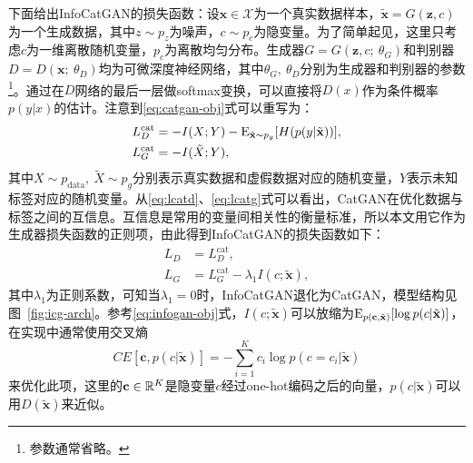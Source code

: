 下面给出InfoCatGAN的损失函数：设$\mathbf{x} \in \mathcal{X}$为一个真实数据样本，$\tilde{\mathbf{x}} = G(\mathbf{z}, c)$为一个生成数据，其中$z\sim p_z$为噪声，$c\sim p_c$为隐变量。为了简单起见，这里只考虑$c$为一维离散随机变量，$p_c$为离散均匀分布。生成器$G = G(\mathbf{z}, c; ~\theta_G)$和判别器$D = D(\mathbf{x}; ~\theta_D)$均为可微深度神经网络，其中$\theta_G, ~\theta_D$分别为生成器和判别器的参数\footnote{参数通常省略。}。通过在$D$网络的最后一层做softmax变换，可以直接将$D(x)$作为条件概率$p(y|x)$的估计。注意到\eqref{eq:catgan-obj}式可以重写为：
\begin{align}
  L_D^{\text{cat}} &= -I(X;Y)-
         \text{E}_{\tilde{\mathbf{x}} \sim p_g}[H(p(y|\tilde{\mathbf{x}}))], \label{eq:lcatd} \\
  L_G^{\text{cat}} &= -I(\tilde{X}; Y), \label{eq:lcatg}
\end{align}
其中$X \sim p_{\text{data}}, ~\tilde{X} \sim p_g$分别表示真实数据和虚假数据对应的随机变量，$Y$表示未知标签对应的随机变量。从\eqref{eq:lcatd}、\eqref{eq:lcatg}式可以看出，CatGAN在优化数据与标签之间的互信息。互信息是常用的变量间相关性的衡量标准，所以本文用它作为生成器损失函数的正则项，由此得到InfoCatGAN的损失函数如下：
\begin{equation}
\label{eq:infocatgan}
\begin{split}
  L_D &= L_D^{\text{cat}}, \\ 
  L_G &= L_G^{\text{cat}} - \lambda_1 I(c; \tilde{\mathbf{x}}),
\end{split}
\end{equation}
其中$\lambda_1$为正则系数，可知当$\lambda_1 = 0$时，InfoCatGAN退化为CatGAN，模型结构见图~\ref{fig:icg-arch}。参考\eqref{eq:infogan-obj}式，$I(c; \tilde{\mathbf{x}})$可以放缩为$\text{E}_{p(\mathbf{c},\tilde{\mathbf{x}})}[\log p(c|\tilde{\mathbf{x}})]$，在实现中通常使用交叉熵
\begin{equation}
  CE[\mathbf{c}, p(c|\tilde{\mathbf{x}})] = -\sum_{i=1}^K c_i \log p(c=c_i | \tilde{\mathbf{x}})
\end{equation}
来优化此项，这里的$\mathbf{c} \in \mathbb{R}^K$是隐变量$c$经过one-hot编码之后的向量，$p(c|\tilde{\mathbf{x}})$可以用$D(\tilde{\mathbf{x}})$来近似。

